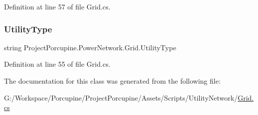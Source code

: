 Definition at line 57 of file Grid.\+cs.

\mbox{\label{class_project_porcupine_1_1_power_network_1_1_grid_ae15fa1698e2b9a4584e012f42a723833}} 
\subsubsection{\texorpdfstring{Utility\+Type}{UtilityType}}
{\footnotesize\ttfamily string Project\+Porcupine.\+Power\+Network.\+Grid.\+Utility\+Type\hspace{0.3cm}{\ttfamily [get]}}



Definition at line 55 of file Grid.\+cs.



The documentation for this class was generated from the following file\+:\begin{DoxyCompactItemize}
\item 
G\+:/\+Workspace/\+Porcupine/\+Project\+Porcupine/\+Assets/\+Scripts/\+Utility\+Network/\hyperlink{_grid_8cs}{Grid.\+cs}\end{DoxyCompactItemize}
